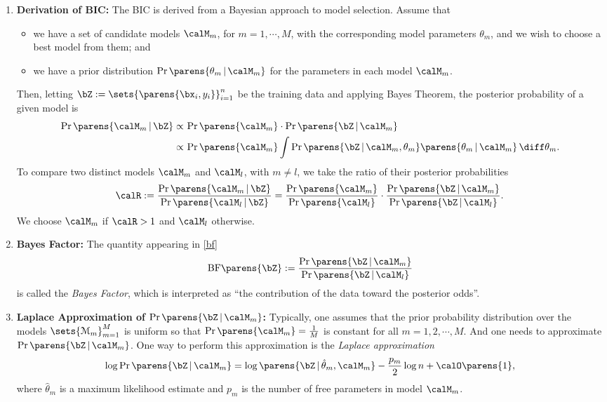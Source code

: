 \documentclass[12pt]{article}
\begin{document}
\begin{enumerate}[label=\textbf{\arabic*.}]
	\item \textbf{Derivation of BIC:} The BIC is derived from a Bayesian approach to model selection. Assume that 
	\begin{itemize}
		\item we have a set of candidate models $\calM_m$, for $ m = 1, \cdots, M$, with the corresponding model parameters $ \theta_m $, and we wish to choose a best model from them; and 
		\item we have a prior distribution $\Pr \parens{\theta_m \,\vert\, \calM_m} $ for the parameters in each model $\calM_m$. 
	\end{itemize}
	Then, letting $\bZ := \sets{\parens{\bx_i, y_i}}_{i=1}^n$ be the training data and applying Bayes Theorem, the posterior probability of a given model is 
	\begin{equation*}
		\begin{aligned}
			\Pr \parens{\calM_m \,\vert\, \bZ} \propto & \, \Pr \parens{\calM_m} \cdot \Pr \parens{\bZ \,\vert\, \calM_m} \\ 
			\propto & \, \Pr \parens{\calM_m} \int \Pr \parens{\bZ \,\vert\, \calM_m, \theta_m} \parens{\theta_m \,\vert\, \calM_m} \, \diff \theta_m. 
		\end{aligned}
	\end{equation*}
	To compare two distinct models $\calM_m$ and $\calM_l$, with $m \neq l$, we take the ratio of their posterior probabilities
	\begin{equation}\label{bf}
		\calR := \frac{\Pr \parens{\calM_m \,\vert\, \bZ}}{\Pr \parens{\calM_l \,\vert\, \bZ}} = \frac{\Pr \parens{\calM_m}}{\Pr \parens{\calM_l}} \cdot \frac{\Pr \parens{\bZ \,\vert\, \calM_m}}{\Pr \parens{\bZ \,\vert\, \calM_l}}. 
	\end{equation}
	We choose $\calM_m$ if $\calR > 1$ and $\calM_l$ otherwise. 
	
	\item \textbf{Bayes Factor:} The quantity appearing in \eqref{bf} 
	\begin{align}
		\mathrm{BF} \parens{\bZ} := \frac{\Pr \parens{\bZ \,\vert\, \calM_m}}{\Pr \parens{\bZ \,\vert\, \calM_l}}
	\end{align}
	is called the \emph{Bayes Factor}, which is interpreted as ``the contribution of the data toward the posterior odds''. 

	\item \textbf{Laplace Approximation of $\Pr \parens{\bZ \,\vert\, \calM_m}$:} Typically, one assumes that the prior probability distribution over the models $ \sets{\mathcal{M}_m}_{m=1}^M $ is uniform so that $\Pr \parens{\calM_m} = \frac{1}{M}$ is constant for all $m = 1, 2, \cdots, M$. And one needs to approximate $\Pr \parens{\bZ \,\vert\, \calM_m}$. One way to perform this approximation is the \textit{Laplace approximation} 
	\begin{equation}\label{eq-bic-deriv}
		\log \Pr \parens{\bZ \,\vert\, \calM_m} = \log \parens{\bZ \,\vert\, \hat{\theta}_m, \calM_m} - \frac{p_m}{2} \log n + \calO \parens{1}, 
	\end{equation}
	where $ \hat{\theta}_m $ is a maximum likelihood estimate and $p_m$ is the number of free parameters in model $ \calM_m$. 
	

\end{enumerate}
\end{document}
